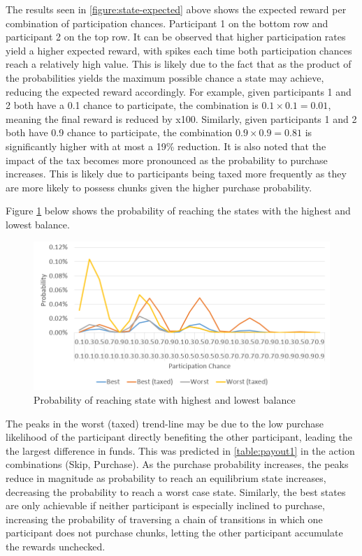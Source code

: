 The results seen in \cref{figure:state-expected} above shows the expected reward per combination of participation chances. Participant 1 on the bottom row and participant 2 on the top row. It can be observed that higher participation rates yield a higher expected reward, with spikes each time both participation chances reach a relatively high value. This is likely due to the fact that as the product of the probabilities yields the maximum possible chance a state may achieve, reducing the expected reward accordingly. For example, given participants 1 and 2 both have a 0.1 chance to participate, the combination is $0.1 \times 0.1 = 0.01$, meaning the final reward is reduced by x100. Similarly, given participants 1 and 2 both have 0.9 chance to participate, the combination $0.9 \times 0.9 = 0.81$ is significantly higher with at most a 19\% reduction. It is also noted that the impact of the tax becomes more pronounced as the probability to purchase increases. This is likely due to participants being taxed more frequently as they are more likely to possess chunks given the higher purchase probability.

Figure \ref{figure:state-bestworst} below shows the probability of reaching the states with the highest and lowest balance.

\begin{figure}[H]
  \centering
  \caption{Probability of reaching state with highest and lowest balance}
  \label{figure:state-bestworst}
  \includegraphics[width=\textwidth]{media/state-bestworst.PNG}
\end{figure}

The peaks in the worst (taxed) trend-line may be due to the low purchase likelihood of the participant directly benefiting the other participant, leading the the largest difference in funds. This was predicted in \cref{table:payout1} in the action combinations (Skip, Purchase). As the purchase probability increases, the peaks reduce in magnitude as probability to reach an equilibrium state increases, decreasing the probability to reach a worst case state. Similarly, the best states are only achievable if neither participant is especially inclined to purchase, increasing the probability of traversing a chain of transitions in which one participant does not purchase chunks, letting the other participant accumulate the rewards unchecked.


